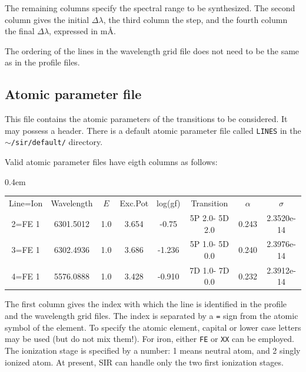 The remaining columns specify the spectral range to be synthesized. The
second column gives the initial $\Delta \lambda$, the third column the
step, and the fourth column the final $\Delta \lambda$, expressed in m\AA\/. 

The ordering of the lines in the wavelength grid file does not need to
be the same as in the profile files. 

\subsection{Atomic parameter file}
\label{damping}
This file contains the atomic parameters of the transitions to be
considered. It may possess a header. There is a default atomic
parameter file called {\tt LINES} in the {\tt $\sim$/sir/default/} directory.

Valid atomic parameter files have eigth columns as follows:
\begin{center}
\tabcolsep 0.4em
\tt
\begin{tabular}{cccccccc}
 Line=Ion & Wavelength & $E$ & Exc.Pot & log(gf) &  Transition & $\alpha$ & $\sigma$  \\
   2=FE 1 & 6301.5012 &   1.0 & 3.654 & -0.75  & 5P 2.0- 5D 2.0 & 0.243  & 2.3520e-14 \\
   3=FE 1 & 6302.4936 &   1.0 & 3.686 & -1.236 & 5P 1.0- 5D 0.0 & 0.240  & 2.3976e-14  \\
   4=FE 1 & 5576.0888 &   1.0 & 3.428 & -0.910 & 7D 1.0- 7D 0.0 & 0.232  & 2.3912e-14 \\
\end{tabular}
\end{center}
The first column gives the index with which the line is identified in
the profile and the wavelength grid files. The index is separated by a
{\tt =} sign from the atomic symbol of the element. To specify the
atomic element, capital or lower case letters may be used (but do not
mix them!). For iron, either {\tt FE} or {\tt XX} can be employed. The
ionization stage is specified by a number: 1 means neutral atom, and 2
singly ionized atom. At present, SIR can handle only the two first
ionization stages.

